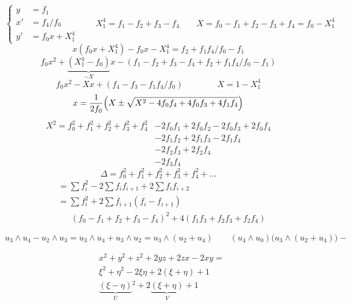 \documentclass[11pt,a4paper]{article}
\begin{document}
\[
\left\lbrace
\begin{aligned}
y &= f_1 \\
x' &= f_4/f_0 \\
y' &= f_0 x + X_1^4
\end{aligned}
\right.
\qquad
X_1^4 = f_1 - f_2 + f_3 - f_4 \qquad
X = f_0 - f_1 + f_2 - f_3 + f_4 = f_0 - X_1^4
\]
\[
x (f_0 x + X_1^4) - f_0 x - X_1^4 = f_2 + f_1 f_4/f_0 - f_1
\]
\[
f_0 x^2 + \underbrace{(X_1^4 - f_0)}_{-X} x
- (f_1 - f_2 + f_3 - f_4 + f_2 + f_1 f_4/f_0 - f_1)
\]
\[
f_0 x^2 - X x + (f_4 - f_3 - f_1 f_4/f_0) \qquad\qquad X = 1 - X_1^4
\]
\[
x = \frac{1}{2 f_0} \Bigl( X \pm \sqrt{X^2 - 4 f_0 f_4 + 4 f_0 f_3
+ 4 f_1 f_4} \Bigr)
\]
\[
\begin{aligned}
X^2 = f_0^2 + f_1^2 + f_2^2 + f_3^2 + f_4^2
 &- 2 f_0 f_1 + 2 f_0 f_2 - 2 f_0 f_3 + 2 f_0 f_4 \\
 &- 2 f_1 f_2 + 2 f_1 f_3 - 2 f_1 f_4 \\
 &- 2 f_2 f_3 + 2 f_2 f_4 \\
 &- 2 f_3 f_4
\end{aligned}
\]
\[
\Delta = f_0^2 + f_1^2 + f_2^2 + f_3^2 + f_4^2 + \ldots
\]
\[
\begin{aligned}
&= \textstyle\sum f_i^2 - 2 \sum f_i f_{i+1} + 2 \sum f_i f_{i+2} \\
&= \textstyle\sum f_i^2 + 2 \sum f_{i+1} (f_i - f_{i+1}) \\
&\phantom{=}\ (f_0 - f_1 + f_2 + f_3 - f_4)^2
 + 4 (f_1 f_3 + f_2 f_3 + f_2 f_4)
\end{aligned}
\]

\[
u_3 \wedge u_4 - u_2 \wedge u_3 = u_3 \wedge u_4 + u_3 \wedge u_2
= u_3 \wedge (u_2 + u_4) \qquad
(u_4 \wedge u_0)\bigl(u_3 \wedge (u_2 + u_4)\bigr) -
\]

\[
\begin{aligned}
&x^2 + y^2 + z^2 + 2yz + 2zx - 2xy = \\
&\xi^2 + \eta^2 - 2\xi\eta + 2(\xi + \eta) + 1 \\
&\underbrace{(\xi - \eta)}_{U}{}^2 + 2\underbrace{(\xi + \eta)}_{V} + 1
\end{aligned}
\]
\end{document}
